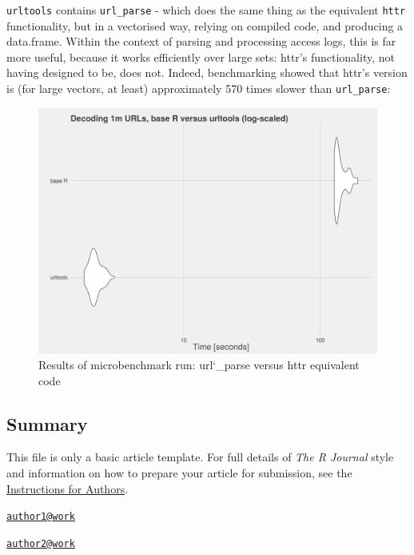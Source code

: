 \texttt{urltools} contains \texttt{url\_parse} - which does the same
thing as the equivalent \texttt{httr} functionality, but in a vectorised
way, relying on compiled code, and producing a data.frame. Within the
context of parsing and processing access logs, this is far more useful,
because it works efficiently over large sets: httr's functionality, not
having designed to be, does not. Indeed, benchmarking showed that httr's
version is (for large vectors, at least) approximately 570 times slower
than \texttt{url\_parse}:

\begin{figure}[h]
    \centering
    \includegraphics[scale=0.4]{decoding_benchmarks}
    \caption{Results of microbenchmark run: url\char`_parse versus httr equivalent code}
\end{figure}

\subsection{Summary}\label{summary}

This file is only a basic article template. For full details of
\emph{The R Journal} style and information on how to prepare your
article for submission, see the
\href{http://journal.r-project.org/latex/RJauthorguide.pdf}{Instructions
for Authors}.



\address{
Oliver Keyes\\
Wikimedia Foundation\\
line 1\\ line 2\\
}
\href{mailto:author1@work}{\nolinkurl{author1@work}}

\address{
Bob Rudis\\
Rapid7\\
line 1\\ line 2\\
}
\href{mailto:author2@work}{\nolinkurl{author2@work}}

